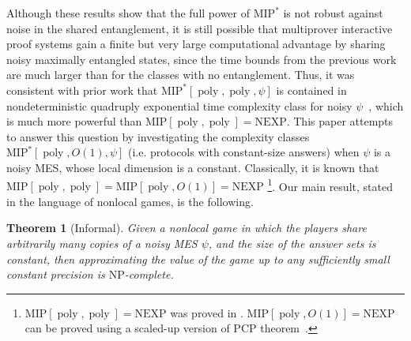 \documentclass[10pt,a4paper]{article}
\theoremstyle{plain}
\newtheorem{theorem}{Theorem}[section]
\theoremstyle{definition}
\newcommand {\Br} [1] {\ensuremath{ \left[ #1 \right] }}
\newcommand{\poly} {\ensuremath{\operatorname{poly}}}
\newcommand{\1}{\mathbb{1}} %
\begin{document}
Although these results show that the full power of $\mathrm{MIP}^*$ is not robust against noise in the shared entanglement, it is still possible that multiprover interactive proof systems gain a finite but very large computational advantage by sharing noisy maximally entangled states, since the time bounds from the previous work are much larger than for the classes with no entanglement. Thus, it was consistent with prior work that $\mathrm{MIP}^*\Br{\poly, \poly, \psi}$ is contained in  nondeterministic quadruply exponential time complexity class for noisy $\psi$~\cite{qin2021nonlocal}, which is much more powerful than $\mathrm{MIP}\Br{\poly, \poly} = \mathrm{NEXP}$. 
This paper attempts to answer this question by investigating the complexity classes $\mathrm{MIP}^*\Br{\poly,O(1),\psi}$ (i.e. protocols with constant-size answers) when $\psi$ is a noisy MES, whose local dimension is a constant. 
Classically, it is known that $\mathrm{MIP}\Br{\poly, \poly} = \mathrm{MIP}\Br{\poly, O(1)} = \mathrm{NEXP}$ \cite{Babai1991,mie2009short}\footnote{$\mathrm{MIP}\Br{\poly, \poly} =\mathrm{NEXP}$ was proved in \cite{Babai1991}. $\mathrm{MIP}\Br{\poly, O(1)} = \mathrm{NEXP}$ can be proved using a scaled-up version of PCP theorem~\cite{mie2009short}.}. Our main result, stated in the language of nonlocal games, is the following.


\begin{theorem}[Informal]
    \label{thm:informal_1}
	Given a nonlocal game in which the players share arbitrarily many copies of a noisy MES $\psi$, and the size of the answer sets is constant, then approximating the value of the game up to any sufficiently small constant precision is  $\mathrm{NP}$-complete. 
\end{theorem}
\end{document}
